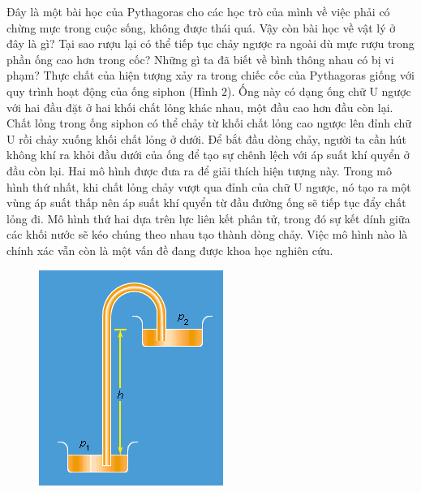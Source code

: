 \begin{multicols}{2}
	\vskip 0.1cm
	Đây là một bài học của Pythagoras cho các học trò của mình về việc phải có chừng mực trong cuộc sống, không được thái quá. Vậy còn bài học về vật lý ở đây là gì? Tại sao rượu lại có thể tiếp tục chảy ngược ra ngoài dù mực rượu trong phần ống cao hơn trong cốc? Những gì ta đã biết về bình thông nhau có bị vi phạm?
	\vskip 0.1cm
	Thực chất của hiện tượng xảy ra trong chiếc cốc của Pythagoras giống với quy trình hoạt động của ống siphon (Hình $2$). Ống này có dạng ống chữ U ngược với hai đầu đặt ở hai khối chất lỏng khác nhau, một đầu cao hơn đầu còn lại. Chất lỏng trong ống siphon có thể chảy từ khối chất lỏng cao ngược lên đỉnh chữ U rồi chảy xuống khối chất lỏng ở dưới. Để bắt đầu dòng chảy, người ta cần hút không khí ra khỏi đầu dưới của ống để tạo sự chênh lệch với áp suất khí quyển ở đầu còn lại. Hai mô hình được đưa ra để giải thích hiện tượng này. Trong mô hình thứ nhất, khi chất lỏng chảy vượt qua đỉnh của chữ U ngược, nó tạo ra một vùng áp suất thấp nên áp suất khí quyển từ đầu đường ống sẽ tiếp tục đẩy chất lỏng đi. Mô hình thứ hai dựa trên lực liên kết phân tử, trong đó sự kết dính giữa các khối nước sẽ kéo chúng theo nhau tạo thành dòng chảy. Việc mô hình nào là chính xác vẫn còn là một vấn đề đang được khoa học nghiên cứu.
	\begin{figure}[H]
		\vspace*{-5pt}
		\centering
		\captionsetup{labelformat= empty, justification=centering}
		\includegraphics[width= 1\linewidth]{2}

\end{figure}
\end{multicols}
